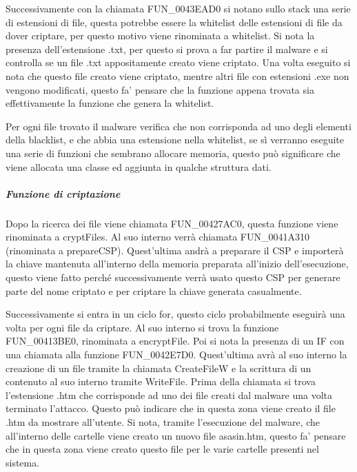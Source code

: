 \documentclass[a4paper,12pt]{article}
\begin{document}
 Successivamente con la chiamata FUN\_0043EAD0 si notano sullo stack una serie di estensioni di file, questa potrebbe essere la whitelist delle estensioni di file da dover criptare, per questo motivo viene rinominata a whitelist. Si nota la presenza dell'estensione .txt, per questo si prova a far partire il malware e si controlla se un file .txt appositamente creato viene criptato. Una volta eseguito si nota che questo file creato viene criptato, mentre altri file con estensioni .exe non vengono modificati, questo fa' pensare che la funzione appena trovata sia effettivamente la funzione che genera la whitelist. 

Per ogni file trovato il malware verifica che non corrisponda ad uno degli elementi della blacklist, e che abbia una estensione nella whitelist, se sì verranno eseguite una serie di funzioni che sembrano allocare memoria, questo può significare che viene allocata una classe ed aggiunta in qualche struttura dati. 

\subparagraph{Funzione di criptazione}
Dopo la ricerca dei file viene chiamata FUN\_00427AC0, questa funzione viene rinominata a cryptFiles. Al suo interno verrà chiamata FUN\_0041A310 (rinominata a prepareCSP). Quest'ultima andrà a preparare il CSP e importerà la chiave mantenuta all'interno della memoria preparata all'inizio dell'esecuzione, questo viene fatto perché successivamente verrà usato questo CSP per generare parte del nome criptato e per criptare la chiave generata casualmente.

Successivamente si entra in un ciclo for, questo ciclo probabilmente eseguirà una volta per ogni file da criptare. Al suo interno si trova la funzione FUN\_00413BE0, rinominata a encryptFile. Poi si nota la presenza di un IF con una chiamata alla funzione FUN\_0042E7D0. Quest'ultima avrà al suo interno la creazione di un file tramite la chiamata CreateFileW e la scrittura di un contenuto al suo interno tramite WriteFile. Prima della chiamata si trova l'estensione .htm che corrisponde ad uno dei file creati dal malware una volta terminato l'attacco. Questo può indicare che in questa zona viene creato il file .htm da mostrare all'utente. Si nota, tramite l'esecuzione del malware, che all'interno delle cartelle viene creato un nuovo file asasin.htm, questo fa' pensare che in questa zona viene creato questo file per le varie cartelle presenti nel sistema.
\end{document}
